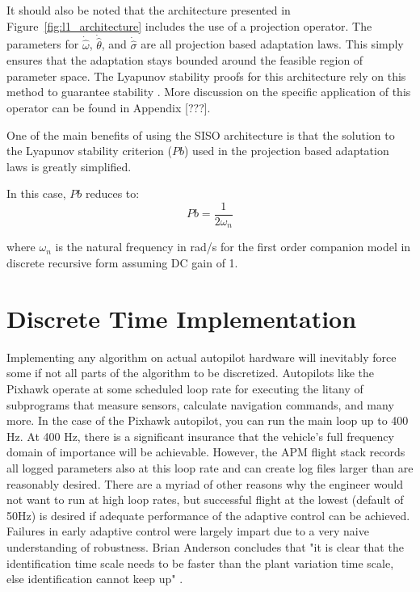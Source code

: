 It should also be noted that the architecture presented in Figure~\ref{fig:l1_architecture} includes the use of a projection operator.  The parameters for $\dot{\hat{\omega}}$, $\dot{\hat{\theta}}$, and $\dot{\hat{\sigma}}$ are all projection based adaptation laws.  This simply ensures that the adaptation stays bounded around the feasible region of parameter space.  The Lyapunov stability proofs for this architecture rely on this method to guarantee stability\cite{hovakimyan2010l1} .  More discussion on the specific application of this operator can be found in Appendix [???].

One of the main benefits of using the \ac{SISO} architecture is that the solution to the Lyapunov stability criterion ($Pb$) used in the projection based adaptation laws is greatly simplified.  

In this case, $Pb$ reduces to:
\begin{equation}
Pb = \frac{1}{2\omega_n}
\end{equation}

where $\omega_n$ is the natural frequency in rad/s for the first order companion model in discrete recursive form assuming DC gain of 1. 


\section{\Lone Discrete Time Implementation}
Implementing any algorithm on actual autopilot hardware will inevitably force some if not all parts of the algorithm to be discretized.  Autopilots like the Pixhawk operate at some scheduled loop rate for executing the litany of subprograms that measure sensors, calculate navigation commands, and many more.  In the case of the Pixhawk autopilot, you can run the main loop up to 400 Hz.  At 400 Hz, there is a significant insurance that the vehicle's full frequency domain of importance will be achievable.  However, the \ac{APM} flight stack records all logged parameters also at this loop rate and can create log files larger than are reasonably desired.  There are a myriad of other reasons why the engineer would not want to run at high loop rates, but successful flight at the lowest (default of 50Hz) is desired if adequate performance of the adaptive control can be achieved.  Failures in early adaptive control were largely impart due to a very naive understanding of robustness.  Brian Anderson concludes that "it is clear that the identification time scale needs to be faster than the plant variation time scale, else identification cannot keep up" \cite{anderson2005failures}.   

